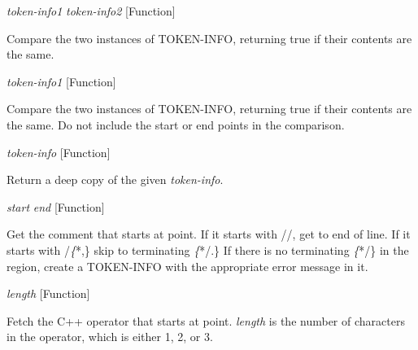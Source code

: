 \vspace{1em}
\noindent
{}
\usebox{\funcname}\emph{token-info1} \emph{token-info2}
 \hfill [Function]

\begin{doc-string}
Compare the two instances of TOKEN-INFO, returning true if their contents
are the same.
\end{doc-string}

\vspace{1em}
\noindent
{}
\usebox{\funcname}\emph{token-info1}
 \hfill [Function]
\hspace*{\wd\funcname}

\begin{doc-string}
Compare the two instances of TOKEN-INFO, returning true if their contents
are the same.  Do not include the start or end points in the comparison.
\end{doc-string}

\vspace{1em}
\noindent
{}
\usebox{\funcname}\emph{token-info}
 \hfill [Function]

\begin{doc-string}
Return a deep copy of the given \emph{token-info}.
\end{doc-string}

\vspace{1em}
\noindent
{}
\usebox{\funcname}\emph{start} \emph{end}
 \hfill [Function]

\begin{doc-string}
Get the comment that starts at point.  If it starts with //, get to end of
line.  If it starts with /\emph\{*,\} skip to terminating \emph\{*/.\}  If there is no terminating
\emph\{*/\} in the region, create a TOKEN-INFO with the appropriate error message in it.
\end{doc-string}

\vspace{1em}
\noindent
{}
\usebox{\funcname}\emph{length}
 \hfill [Function]

\begin{doc-string}
Fetch the C++ operator that starts at point.  \emph{length} is the number of characters
in the operator, which is either 1, 2, or 3.
\end{doc-string}

